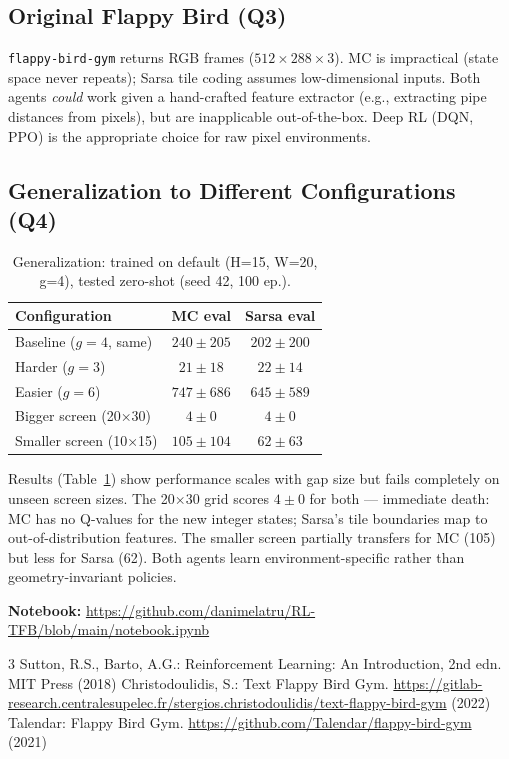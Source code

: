 \documentclass[runningheads]{llncs}
\begin{document}
\subsection{Original Flappy Bird (Q3)}

\texttt{flappy-bird-gym} \cite{flappybird} returns RGB frames
($512\!\times\!288\!\times\!3$). MC is impractical (state space never repeats);
Sarsa tile coding assumes low-dimensional inputs. Both agents \emph{could} work
given a hand-crafted feature extractor (e.g., extracting pipe distances from pixels),
but are inapplicable out-of-the-box. Deep RL (DQN, PPO) is the appropriate choice
for raw pixel environments.

\subsection{Generalization to Different Configurations (Q4)}

\begin{table}[!ht]
\centering
\caption{Generalization: trained on default (H=15, W=20, g=4), tested zero-shot (seed 42, 100 ep.).}
\label{tab:gen}
\begin{tabular}{lcc}
\toprule
Configuration & MC eval & Sarsa eval \\
\midrule
Baseline ($g=4$, same)    & $240\pm205$ & $202\pm200$ \\
Harder ($g=3$)            & $21\pm18$   & $22\pm14$   \\
Easier ($g=6$)            & $747\pm686$ & $645\pm589$ \\
Bigger screen (20×30)     & $4\pm0$     & $4\pm0$     \\
Smaller screen (10×15)    & $105\pm104$ & $62\pm63$   \\
\bottomrule
\end{tabular}
\end{table}

Results (Table~\ref{tab:gen}) show performance scales with gap size but fails completely
on unseen screen sizes. The 20$\times$30 grid scores $4\pm0$ for both — immediate death:
MC has no Q-values for the new integer states; Sarsa's tile boundaries map to
out-of-distribution features. The smaller screen partially transfers for MC (105) but
less for Sarsa (62). Both agents learn environment-specific rather than geometry-invariant policies.

\FloatBarrier

\noindent\textbf{Notebook:} \url{https://github.com/danimelatru/RL-TFB/blob/main/notebook.ipynb}

\begin{thebibliography}{3}
Sutton, R.S., Barto, A.G.: Reinforcement Learning: An Introduction, 2nd edn. MIT Press (2018)
Christodoulidis, S.: Text Flappy Bird Gym.
\url{https://gitlab-research.centralesupelec.fr/stergios.christodoulidis/text-flappy-bird-gym} (2022)
Talendar: Flappy Bird Gym.
\url{https://github.com/Talendar/flappy-bird-gym} (2021)
\end{thebibliography}
\end{document}
